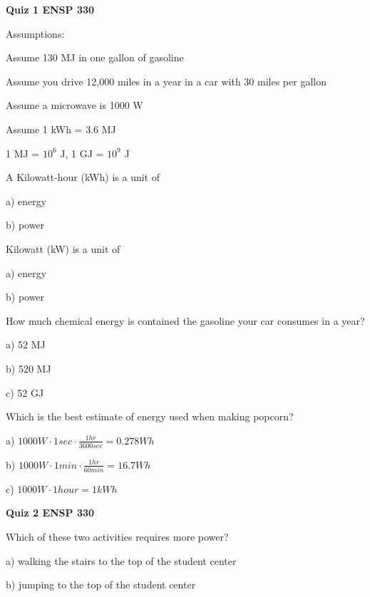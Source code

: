 \documentclass[12pt, oneside]{article}
\begin{document}
{\bf Quiz 1 \hfill ENSP 330}


Assumptions:

Assume 130 MJ in one gallon of gasoline

Assume you drive 12,000 miles in a year in a car with 30 miles per gallon

Assume a microwave is 1000 W

Assume 1 kWh = 3.6 MJ

1 MJ = $10^6$ J, 1 GJ = $10^9$ J


\problem{}
A Kilowatt-hour (kWh) is a unit of

a) energy

b) power




\problem{}
Kilowatt (kW) is a unit of

a) energy

b) power




\problem{}
How much chemical energy is contained the gasoline your car consumes in a year?

a) 52 MJ

b) 520 MJ

c) 52 GJ


\vfill

\problem{}
Which is the best estimate of energy used when making popcorn?

a) $ 1000W \cdot 1 sec \cdot \frac{1 hr}{3600 sec} = 0.278 Wh $

b) $ 1000W \cdot 1 min \cdot \frac{1 hr}{60 min} = 16.7 Wh $

c) $ 1000W \cdot 1 hour  = 1 kWh $








\newpage
\setcounter{problem}{0}
{\bf Quiz 2 \hfill ENSP 330}

\problem{}
Which of these two activities requires more power?

a) walking the stairs to the top of the student center

b) jumping to the top of the student center
\end{document}
